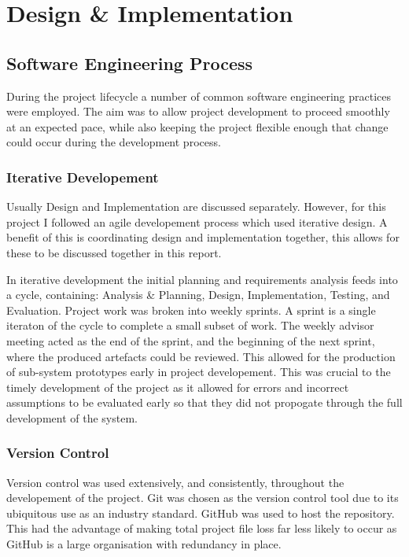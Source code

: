 \documentclass{l4proj}
\begin{document}
\chapter{Design \& Implementation}

\section{Software Engineering Process}

During the project lifecycle a number of common software engineering practices were employed. The aim was to allow project development to proceed smoothly at an expected pace, while also keeping the project flexible enough that change could occur during the development process.

\subsection{Iterative Developement}

Usually Design and Implementation are discussed separately. However, for this project I followed an agile developement process which used iterative design. A benefit of this is coordinating design and implementation together, this allows for these to be discussed together in this report.

In iterative development the initial planning and requirements analysis feeds into a cycle, containing: Analysis \& Planning, Design, Implementation, Testing, and Evaluation. Project work was broken into weekly sprints. A sprint is a single iteraton of the cycle to complete a small subset of work. The weekly advisor meeting acted as the end of the sprint, and the beginning of the next sprint, where the produced artefacts could be reviewed. This allowed for the production of sub-system prototypes early in project developement. This was crucial to the timely development of the project as it allowed for errors and incorrect assumptions to be evaluated early so that they did not propogate through the full development of the system.

\subsection{Version Control}

Version control was used extensively, and consistently, throughout the developement of the project. Git was chosen as the version control tool due to its ubiquitous use as an industry standard. GitHub was used to host the repository. This had the advantage of making total project file loss far less likely to occur as GitHub is a large organisation with redundancy in place.
\end{document}
